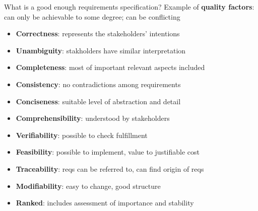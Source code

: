 
\begin{Slide}{What is a good enough requirements specification?}
Example of \textbf{quality factors}:\\can only be achievable to some degree; can be conflicting
\begin{itemize}
\item \textbf{Correctness}: represents the stakeholders' intentions
\item \textbf{Unambiguity}: stakholders have similar interpretation
\item \textbf{Completeness}: most of important relevant aspects included
\item \textbf{Consistency}: no contradictions among requirements
\item \textbf{Conciseness}: suitable level of abstraction and detail 
\item \textbf{Comprehensibility}: understood by stakeholders 
\item \textbf{Verifiability}: possible to check fulfillment 
\item \textbf{Feasibility}: possible to implement, value to justifiable cost 
\item \textbf{Traceability}: reqs can be referred to, can find origin of reqs
\item \textbf{Modifiability}: easy to change, good structure
\item \textbf{Ranked}: includes assessment of importance and stability



\end{itemize}
\end{Slide}